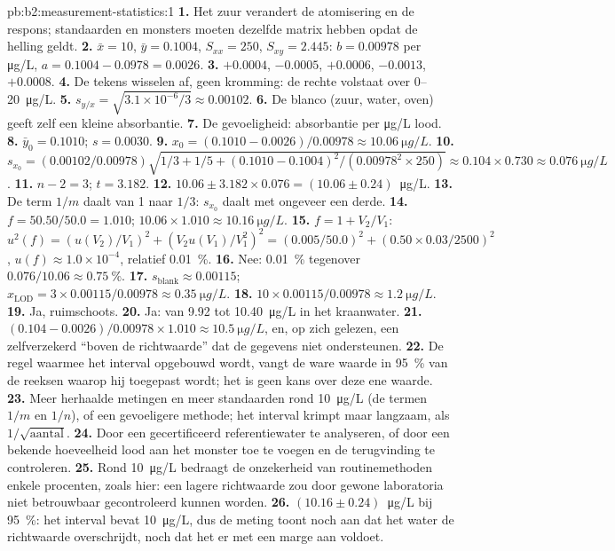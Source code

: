 \begin{solution}{pb:b2:measurement-statistics:1}
\textbf{1.} Het zuur verandert de atomisering en de respons; standaarden en monsters moeten dezelfde
matrix hebben opdat de helling geldt.
\textbf{2.} $\bar x = 10$, $\bar y = 0.1004$, $S_{xx} = 250$, $S_{xy} = 2.445$: $b = 0.00978$ per
\unit{\micro g/L}, $a = 0.1004 - 0.0978 = 0.0026$.
\textbf{3.} $+0.0004$, $-0.0005$, $+0.0006$, $-0.0013$, $+0.0008$.
\textbf{4.} De tekens wisselen af, geen kromming: de rechte volstaat over 0--\qty{20}{\micro g/L}.
\textbf{5.} $s_{y/x} = \sqrt{3.1 \times 10^{-6}/3} \approx 0.00102$.
\textbf{6.} De blanco (zuur, water, oven) geeft zelf een kleine absorbantie.
\textbf{7.} De gevoeligheid: absorbantie per \unit{\micro g/L} lood.
\textbf{8.} $\bar y_0 = 0.1010$; $s = 0.0030$.
\textbf{9.} $x_0 = (0.1010 - 0.0026)/0.00978 \approx \qty{10.06}{\micro g/L}$.
\textbf{10.} $s_{x_0} = (0.00102/0.00978)\sqrt{1/3 + 1/5 + (0.1010 - 0.1004)^2/(0.00978^2 \times 250)}
\approx 0.104 \times 0.730 \approx \qty{0.076}{\micro g/L}$.
\textbf{11.} $n - 2 = 3$; $t = 3.182$.
\textbf{12.} $10.06 \pm 3.182 \times 0.076 = (10.06 \pm 0.24)$~\unit{\micro g/L}.
\textbf{13.} De term $1/m$ daalt van 1 naar $1/3$: $s_{x_0}$ daalt met ongeveer een derde.
\textbf{14.} $f = 50.50/50.0 = 1.010$; $10.06 \times 1.010 \approx \qty{10.16}{\micro g/L}$.
\textbf{15.} $f = 1 + V_2/V_1$: $u^2(f) = (u(V_2)/V_1)^2 + (V_2u(V_1)/V_1^2)^2 = (0.005/50.0)^2 +
(0.50 \times 0.03/2500)^2$, $u(f) \approx 1.0 \times 10^{-4}$, relatief 0.01~\%.
\textbf{16.} Nee: 0.01~\% tegenover $0.076/10.06 \approx 0.75~\%$.
\textbf{17.} $s_{\mathrm{blank}} \approx 0.00115$; $x_{\mathrm{LOD}} = 3 \times 0.00115/0.00978 \approx
\qty{0.35}{\micro g/L}$.
\textbf{18.} $10 \times 0.00115/0.00978 \approx \qty{1.2}{\micro g/L}$.
\textbf{19.} Ja, ruimschoots.
\textbf{20.} Ja: van 9.92 tot \qty{10.40}{\micro g/L} in het kraanwater.
\textbf{21.} $(0.104 - 0.0026)/0.00978 \times 1.010 \approx \qty{10.5}{\micro g/L}$, en, op zich gelezen,
een zelfverzekerd ``boven de richtwaarde'' dat de gegevens niet ondersteunen.
\textbf{22.} De regel waarmee het interval opgebouwd wordt, vangt de ware waarde in 95~\% van de reeksen waarop
hij toegepast wordt; het is geen kans over deze ene waarde.
\textbf{23.} Meer herhaalde metingen en meer standaarden rond \qty{10}{\micro g/L} (de termen $1/m$ en
$1/n$), of een gevoeligere methode; het interval krimpt maar langzaam, als $1/\sqrt{\text{aantal}}$.
\textbf{24.} Door een gecertificeerd referentiewater te analyseren, of door een bekende hoeveelheid lood aan het monster
toe te voegen en de terugvinding te controleren.
\textbf{25.} Rond \qty{10}{\micro g/L} bedraagt de onzekerheid van routinemethoden enkele procenten, zoals hier: een
lagere richtwaarde zou door gewone laboratoria niet betrouwbaar gecontroleerd kunnen worden.
\textbf{26.} $\boldsymbol{(10.16 \pm 0.24)}$~\unit{\micro g/L} bij 95~\%: het interval bevat
\qty{10}{\micro g/L}, dus de meting toont noch aan dat het water de richtwaarde overschrijdt, noch dat het er met een
marge aan voldoet.
\end{solution}
